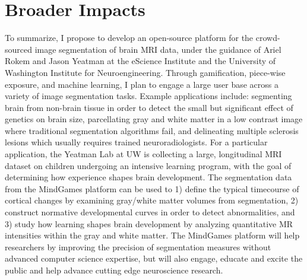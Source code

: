\section*{Broader Impacts}

To summarize, I propose to develop an open-source platform for the crowd-sourced image segmentation of brain MRI data, under the guidance of Ariel Rokem and Jason Yeatman at the eScience Institute and the University of Washington Institute for Neuroengineering. Through gamification, piece-wise exposure, and machine learning, I plan to engage a large user base across a variety of image segmentation tasks. Example applications include: segmenting brain from non-brain tissue in order to detect the small but significant effect of genetics on brain size, parcellating gray and white matter in a low contrast image where traditional segmentation algorithms fail, and delineating multiple sclerosis lesions which usually requires trained neuroradiologists. For a particular application, the Yeatman Lab at UW is collecting a large, longitudinal MRI  dataset on children undergoing an intensive learning program, with the goal of determining how experience shapes brain development. The segmentation data from the MindGames platform can be used to 1) define the typical timecourse of cortical changes by examining gray/white matter volumes from segmentation, 2) construct normative developmental curves in order to detect abnormalities, and 3) study how learning shapes brain development by analyzing quantitative MR intensities within the gray and white matter. The MindGames platform will help researchers by improving the precision of segmentation measures without advanced computer science expertise, but will also engage, educate and excite the public and help advance cutting edge neuroscience research. 
